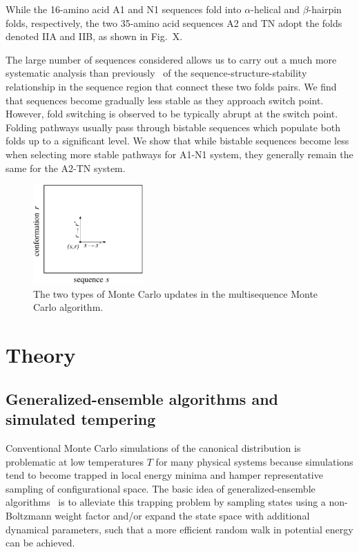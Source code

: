 \documentclass[%
 aip,
rsi,%
 amsmath,amssymb,
 reprint,%
]{revtex4-1}
\begin{document}
While the 16-amino acid A1 and N1 sequences fold into $\alpha$-helical and $\beta$-hairpin folds, respectively, the two 35-amino acid sequences A2 and TN adopt the folds denoted IIA and IIB, as shown in Fig.~X. 

The large number of sequences considered allows us to carry out a much more systematic analysis than previously~\cite{Holzgrafe2014,Holzgrafe2015} of the sequence-structure-stability relationship in the sequence region that connect these two folds pairs. We find that sequences become gradually less stable as they approach switch point. However, fold switching is observed to be typically abrupt at the switch point. Folding pathways usually pass through bistable sequences which populate both folds up to a significant level. We show that while bistable sequences become less when selecting more stable pathways for A1-N1 system, they generally remain the same for the A2-TN system.


\begin{figure}
\includegraphics[width=4.2cm]{Fig1}
\caption{The two types of Monte Carlo updates in the multisequence Monte Carlo algorithm.}
\end{figure}

\section{Theory}

\subsection{Generalized-ensemble algorithms and simulated tempering}
\noindent
Conventional Monte Carlo simulations of the canonical distribution is problematic at low temperatures $T$ for many physical systems because simulations tend to become trapped in local energy minima and hamper representative sampling of configurational space. The basic idea of generalized-ensemble algorithms~\cite{Mitsutake2001} is to alleviate this trapping problem by sampling states using a non-Boltzmann weight factor and/or expand the state space with additional dynamical parameters, such that a more efficient random walk in potential energy can be achieved. 
\end{document}
